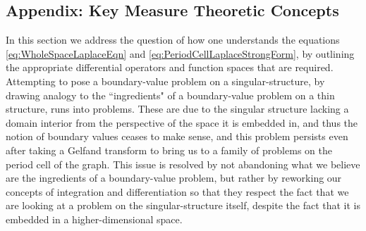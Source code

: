 \subsection{Appendix: Key Measure Theoretic Concepts} \label{ssec:MeasureTheory}
In this section we address the question of how one understands the equations \eqref{eq:WholeSpaceLaplaceEqn} and \eqref{eq:PeriodCellLaplaceStrongForm}, by outlining the appropriate differential operators and function spaces that are required.
Attempting to pose a boundary-value problem on a singular-structure, by drawing analogy to the ``ingredients" of a boundary-value problem on a thin structure, runs into problems.
These are due to the singular structure lacking a domain interior from the perspective of the space it is embedded in, and thus the notion of boundary values ceases to make sense, and this problem persists even after taking a Gelfand transform to bring us to a family of problems on the period cell of the graph.
This issue is resolved by not abandoning what we believe are the ingredients of a boundary-value problem, but rather by reworking our concepts of integration and differentiation so that they respect the fact that we are looking at a problem on the singular-structure itself, despite the fact that it is embedded in a higher-dimensional space. 

